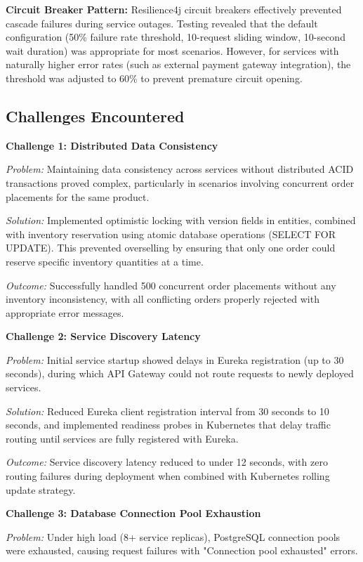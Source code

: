 \textbf{Circuit Breaker Pattern:} Resilience4j circuit breakers effectively prevented cascade failures during service outages. Testing revealed that the default configuration (50\% failure rate threshold, 10-request sliding window, 10-second wait duration) was appropriate for most scenarios. However, for services with naturally higher error rates (such as external payment gateway integration), the threshold was adjusted to 60\% to prevent premature circuit opening.

\subsection{Challenges Encountered}

\textbf{Challenge 1: Distributed Data Consistency}

\textit{Problem:} Maintaining data consistency across services without distributed ACID transactions proved complex, particularly in scenarios involving concurrent order placements for the same product.

\textit{Solution:} Implemented optimistic locking with version fields in entities, combined with inventory reservation using atomic database operations (SELECT FOR UPDATE). This prevented overselling by ensuring that only one order could reserve specific inventory quantities at a time.

\textit{Outcome:} Successfully handled 500 concurrent order placements without any inventory inconsistency, with all conflicting orders properly rejected with appropriate error messages.

\textbf{Challenge 2: Service Discovery Latency}

\textit{Problem:} Initial service startup showed delays in Eureka registration (up to 30 seconds), during which API Gateway could not route requests to newly deployed services.

\textit{Solution:} Reduced Eureka client registration interval from 30 seconds to 10 seconds, and implemented readiness probes in Kubernetes that delay traffic routing until services are fully registered with Eureka.

\textit{Outcome:} Service discovery latency reduced to under 12 seconds, with zero routing failures during deployment when combined with Kubernetes rolling update strategy.

\textbf{Challenge 3: Database Connection Pool Exhaustion}

\textit{Problem:} Under high load (8+ service replicas), PostgreSQL connection pools were exhausted, causing request failures with "Connection pool exhausted" errors.

